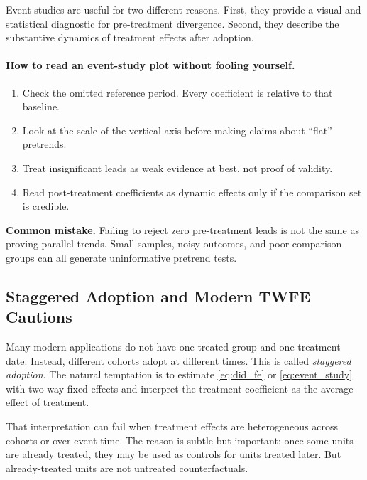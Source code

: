 Event studies are useful for two different reasons. First, they provide a visual and statistical diagnostic for pre-treatment divergence. Second, they describe the substantive dynamics of treatment effects after adoption.

\paragraph{How to read an event-study plot without fooling yourself.}
\begin{enumerate}
\item Check the omitted reference period. Every coefficient is relative to that baseline.
\item Look at the scale of the vertical axis before making claims about ``flat'' pretrends.
\item Treat insignificant leads as weak evidence at best, not proof of validity.
\item Read post-treatment coefficients as dynamic effects only if the comparison set is credible.
\end{enumerate}

\begin{boxF}
\textbf{Common mistake.}
Failing to reject zero pre-treatment leads is not the same as proving parallel trends. Small samples, noisy outcomes, and poor comparison groups can all generate uninformative pretrend tests.
\end{boxF}

\subsection{Staggered Adoption and Modern TWFE Cautions}
Many modern applications do not have one treated group and one treatment date. Instead, different cohorts adopt at different times. This is called \emph{staggered adoption}. The natural temptation is to estimate \eqref{eq:did_fe} or \eqref{eq:event_study} with two-way fixed effects and interpret the treatment coefficient as the average effect of treatment.

That interpretation can fail when treatment effects are heterogeneous across cohorts or over event time. The reason is subtle but important: once some units are already treated, they may be used as controls for units treated later. But already-treated units are not untreated counterfactuals.

